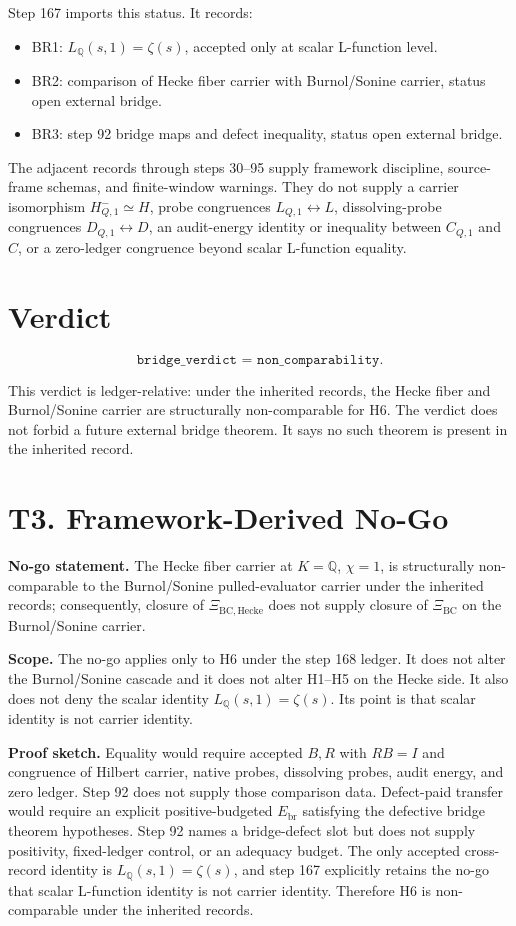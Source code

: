 \documentclass[11pt]{article}
\newcommand{\XiBC}{\Xi_{\mathrm{BC}}}
\newcommand{\XiH}{\Xi_{\mathrm{BC,Hecke}}}
\newcommand{\Q}{\mathbb Q}
\newcommand{\HH}{H_{Q,1}^{-}}
\begin{document}
Step 167 imports this status. It records:
\begin{itemize}[leftmargin=2em]
\item BR1: \(L_{\Q}(s,1)=\zeta(s)\), accepted only at scalar L-function level.
\item BR2: comparison of Hecke fiber carrier with Burnol/Sonine carrier,
status open external bridge.
\item BR3: step 92 bridge maps and defect inequality, status open external bridge.
\end{itemize}

The adjacent records through steps 30--95 supply framework discipline,
source-frame schemas, and finite-window warnings. They do not supply a
carrier isomorphism \(\HH\simeq H\), probe congruences
\(L_{Q,1}\leftrightarrow L\), dissolving-probe congruences
\(D_{Q,1}\leftrightarrow D\), an audit-energy identity or inequality
between \(C_{Q,1}\) and \(C\), or a zero-ledger congruence beyond scalar
L-function equality.

\section{Verdict}

\[
\boxed{\texttt{bridge\_verdict = non\_comparability}.}
\]

This verdict is ledger-relative: under the inherited records, the Hecke
fiber and Burnol/Sonine carrier are structurally non-comparable for H6.
The verdict does not forbid a future external bridge theorem. It says no
such theorem is present in the inherited record.

\section{T3. Framework-Derived No-Go}

\textbf{No-go statement.}
The Hecke fiber carrier at \(K=\Q\), \(\chi=1\), is structurally
non-comparable to the Burnol/Sonine pulled-evaluator carrier under the
inherited records; consequently, closure of \(\XiH\) does not supply closure
of \(\XiBC\) on the Burnol/Sonine carrier.

\textbf{Scope.}
The no-go applies only to H6 under the step 168 ledger. It does not alter
the Burnol/Sonine cascade and it does not alter H1--H5 on the Hecke side.
It also does not deny the scalar identity \(L_{\Q}(s,1)=\zeta(s)\). Its
point is that scalar identity is not carrier identity.

\textbf{Proof sketch.}
Equality would require accepted \(B,R\) with \(RB=I\) and congruence of
Hilbert carrier, native probes, dissolving probes, audit energy, and zero
ledger. Step 92 does not supply those comparison data. Defect-paid transfer
would require an explicit positive-budgeted \(E_{\mathrm{br}}\) satisfying
the defective bridge theorem hypotheses. Step 92 names a bridge-defect slot
but does not supply positivity, fixed-ledger control, or an adequacy budget.
The only accepted cross-record identity is \(L_{\Q}(s,1)=\zeta(s)\), and
step 167 explicitly retains the no-go that scalar L-function identity is not
carrier identity. Therefore H6 is non-comparable under the inherited records.
\end{document}
